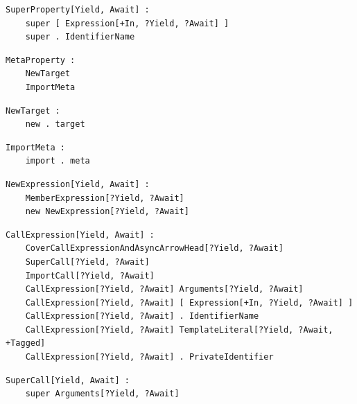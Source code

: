 \noindent\textbf{\texttt{}}\par
\begin{lstlisting}
SuperProperty[Yield, Await] :
    super [ Expression[+In, ?Yield, ?Await] ]
    super . IdentifierName
\end{lstlisting}

\noindent\textbf{\texttt{}}\par
\begin{lstlisting}
MetaProperty :
    NewTarget
    ImportMeta
\end{lstlisting}

\noindent\textbf{\texttt{}}\par
\begin{lstlisting}
NewTarget :
    new . target
\end{lstlisting}

\noindent\textbf{\texttt{}}\par
\begin{lstlisting}
ImportMeta :
    import . meta
\end{lstlisting}

\noindent\textbf{\texttt{}}\par
\begin{lstlisting}
NewExpression[Yield, Await] :
    MemberExpression[?Yield, ?Await]
    new NewExpression[?Yield, ?Await]
\end{lstlisting}

\noindent\textbf{\texttt{}}\par
\begin{lstlisting}
CallExpression[Yield, Await] :
    CoverCallExpressionAndAsyncArrowHead[?Yield, ?Await]
    SuperCall[?Yield, ?Await]
    ImportCall[?Yield, ?Await]
    CallExpression[?Yield, ?Await] Arguments[?Yield, ?Await]
    CallExpression[?Yield, ?Await] [ Expression[+In, ?Yield, ?Await] ]
    CallExpression[?Yield, ?Await] . IdentifierName
    CallExpression[?Yield, ?Await] TemplateLiteral[?Yield, ?Await, +Tagged]
    CallExpression[?Yield, ?Await] . PrivateIdentifier
\end{lstlisting}

\noindent\textbf{\texttt{}}\par
\begin{lstlisting}
SuperCall[Yield, Await] :
    super Arguments[?Yield, ?Await]
\end{lstlisting}

